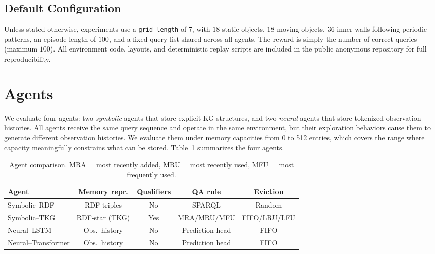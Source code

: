 \documentclass[11pt]{article}
\begin{document}
\subsection{Default Configuration}

Unless stated otherwise, experiments use a \texttt{grid\_length} of $7$, with
$18$ static objects, $18$ moving objects, $36$ inner walls following periodic
patterns, an episode length of $100$, and a fixed query list shared across all
agents. The reward is simply the number of correct queries (maximum $100$).
All environment code, layouts, and deterministic replay scripts are included in
the public anonymous repository for full reproducibility.

\section{Agents}
\label{sec:agents}

We evaluate four agents: two \emph{symbolic} agents that store explicit
KG structures, and two \emph{neural} agents that store tokenized observation histories. All agents receive the same query sequence and operate in the same environment, but their exploration behaviors cause them to generate different observation histories. We evaluate them under memory capacities from 0 to 512 entries, which covers the range where capacity meaningfully constrains what can be stored. Table~\ref{tab:agents} summarizes the four agents.

\begin{table}[tb]
\centering
\small
\begin{tabular}{lcccc}
\toprule
\textbf{Agent} &
\textbf{Memory repr.} &
\textbf{Qualifiers} &
\textbf{QA rule} &
\textbf{Eviction} \\
\midrule
Symbolic--RDF &
RDF triples &
No &
SPARQL &
Random \\

Symbolic--TKG &
RDF-star (TKG) &
Yes &
MRA/MRU/MFU &
FIFO/LRU/LFU \\

Neural--LSTM &
Obs.\ history &
No &
Prediction head &
FIFO \\

Neural--Transformer &
Obs.\ history &
No &
Prediction head &
FIFO \\
\bottomrule
\end{tabular}
\caption{Agent comparison. MRA = most recently added, MRU = most recently used,
MFU = most frequently used.}
\label{tab:agents}
\end{table}
\end{document}
